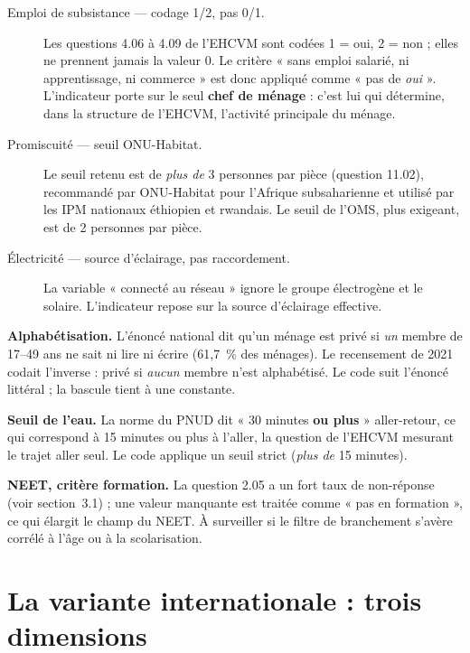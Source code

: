 \documentclass[11pt,a4paper]{article}
\begin{document}
\begin{description}
  \item[Emploi de subsistance --- codage 1/2, pas 0/1.] Les questions 4.06 à 4.09 de l'EHCVM sont
  codées 1 = oui, 2 = non ; elles ne prennent jamais la valeur 0. Le critère « sans emploi
  salarié, ni apprentissage, ni commerce » est donc appliqué comme « pas de \emph{oui} ». L'indicateur
  porte sur le seul \textbf{chef de ménage} : c'est lui qui détermine, dans la structure de
  l'EHCVM, l'activité principale du ménage.

  \item[Promiscuité --- seuil ONU-Habitat.] Le seuil retenu est de \emph{plus de} 3 personnes par
  pièce (question 11.02), recommandé par ONU-Habitat pour l'Afrique subsaharienne et utilisé par
  les IPM nationaux éthiopien et rwandais. Le seuil de l'OMS, plus exigeant, est de 2 personnes
  par pièce.

  \item[Électricité --- source d'éclairage, pas raccordement.] La variable « connecté au réseau »
  ignore le groupe électrogène et le solaire. L'indicateur repose sur la source d'éclairage
  effective.
\end{description}

\begin{attention}
\textbf{Alphabétisation.} L'énoncé national dit qu'un ménage est privé si \emph{un} membre de
17--49 ans ne sait ni lire ni écrire (61,7~\% des ménages). Le recensement de 2021 codait
l'inverse : privé si \emph{aucun} membre n'est alphabétisé. Le code suit l'énoncé littéral ; la
bascule tient à une constante.

\medskip
\textbf{Seuil de l'eau.} La norme du PNUD dit « 30 minutes \textbf{ou plus} » aller-retour, ce qui
correspond à 15 minutes ou plus à l'aller, la question de l'EHCVM mesurant le trajet aller seul.
Le code applique un seuil strict (\emph{plus de} 15 minutes).

\medskip
\textbf{NEET, critère formation.} La question 2.05 a un fort taux de non-réponse (voir
section~3.1) ; une valeur manquante est traitée comme « pas en formation », ce qui élargit le
champ du NEET. À surveiller si le filtre de branchement s'avère corrélé à l'âge ou à la
scolarisation.
\end{attention}

\section{La variante internationale : trois dimensions}
\label{sec:international}
\end{document}
